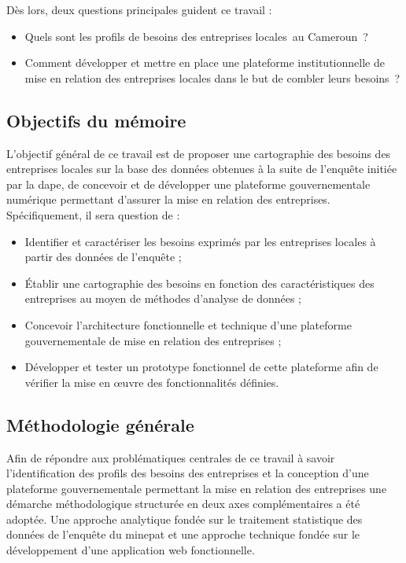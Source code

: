 \documentclass[12pt, a4paper, oneside]{report}
\begin{document}
	Dès lors, deux questions principales guident ce travail : 
	\begin{itemize}
		\item Quels sont les profils de besoins des entreprises locales au Cameroun ? 
		\item Comment développer et mettre en place une plateforme institutionnelle de mise en relation des entreprises locales dans le but de combler leurs besoins ?
	\end{itemize}
	\newpage
	\subsection{Objectifs du mémoire}
	L’objectif général de ce travail est de proposer une cartographie des besoins des entreprises locales sur la base des données obtenues à la suite de l’enquête initiée par la \gls{dape}, de concevoir et de développer une plateforme gouvernementale numérique permettant d’assurer la mise en relation des entreprises. Spécifiquement, il sera question de :
	\begin{itemize}
		\item Identifier et caractériser les besoins exprimés par les entreprises locales à partir des données de l'enquête ;
		\item Établir une cartographie des besoins en fonction des caractéristiques des entreprises au moyen de méthodes d'analyse de données ;
		\item Concevoir l'architecture fonctionnelle et technique d'une plateforme gouvernementale de mise en relation des entreprises ;
		\item Développer et tester un prototype fonctionnel de cette plateforme afin de vérifier la mise en œuvre des fonctionnalités définies.
	\end{itemize}

	\subsection{Méthodologie générale}
	\label{sec:methodologie_generale}
	
	Afin de répondre aux problématiques centrales de ce travail 
	à savoir l'identification des profils des besoins des entreprises et la conception d'une plateforme gouvernementale permettant
	la mise en relation des entreprises une
	démarche méthodologique structurée en deux axes complémentaires
	a été adoptée. Une approche analytique fondée sur le
	traitement statistique des données de l'enquête du \gls{minepat}
	et une approche technique fondée sur le développement d'une
	application web fonctionnelle.
\end{document}
